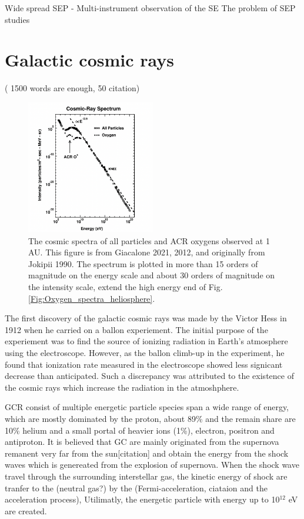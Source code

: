 Wide spread SEP
	- 
Multi-instrument observation of the SE
The problem of SEP studies



\section{Galactic cosmic rays} ( 1500 words are enough, 50 citation)

\begin{figure}
	\centering
	\includegraphics[width = 0.5\textwidth]{images/oxygen_cosmic-ray spectrum.png}
	
	\caption{The cosmic spectra of all particles and ACR oxygens observed at 1 AU. This figure is from Giacalone 2021, 2012, and originally from Jokipii 1990.
	The spectrum is plotted in more than 15 orders of magnitude on the energy scale and about 30 orders of magnitude on the intensity scale, extend the high energy end of Fig.\ref{Fig:Oxygen_spectra_heliosphere}.}
	\label{Fig:Oxygen_spectra_cosmic_ray}
\end{figure}
The first discovery of the galactic cosmic rays was made by the Victor Hess in 1912 when he carried on a ballon experiement. The initial purpose of the experiement was to find the source of ionizing radiation in Earth's atmosphere using the electroscope. However, as the ballon climb-up in the experiment, he found that ionization rate measured in the electroscope showed less signicant decrease than anticipated. Such a discrepancy was attributed to the existence of the cosmic rays which increase the radiation in the atmoshphere.

\acs{GCR} consist of multiple energetic particle species span a wide range of energy, which are mostly dominated by the proton, about 89\%  and the remain share are 10\% helium and a small portal of heavier ions (1\%), electron, positron and antiproton. 
It is believed that \acs{GC} are mainly originated from the supernova remanent very far from the sun[citation] and obtain the energy from the shock waves which is genereated from the explosion of supernova. When the shock wave travel through the surrounding interstellar gas, the kinetic energy of shock are tranfer to the  (neutral gas?) by the (Fermi-acceleration, ciataion and the acceleration process), Utilimatly, the energetic particle with energy up to 10$^12$ eV are created.

